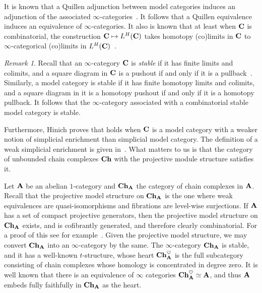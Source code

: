 \documentclass[psamsfonts]{amsart}
\theoremstyle{plain}
\theoremstyle{definition}
\theoremstyle{remark}
\newtheorem{rem}[thm]{Remark}
\newcommand{\catname}[1]{{\normalfont\textbf{#1}}}
\newcommand{\ch}{\catname{Ch}}
\newcommand{\DK}{L^H}
\begin{document}
 It is known that a Quillen adjunction between model categories induces an adjunction of the associated $\infty$-categories~\cite[Proposition 1.5.1]{HinichDK}. It follows that a Quillen equivalence induces an equivalence of $\infty$-categories. It also is known that at least when $\catname{C}$ is combinatorial, the construction $\catname{C}\mapsto \DK(\catname{C})$ takes homotopy (co)limits in $\catname{C}$ to $\infty$-categorical (co)limits in $\DK(\catname{C})$~\cite[Corollary 1.5.2]{HinichDK}. 
\begin{rem} \label{rem:stable}
 Recall that an $\infty$-category $\catname{C}$ is {\it stable} if it has finite limits and colimits, and a square diagram in $\catname{C}$ is a pushout if and only if it is a pullback~\cite[Proposition 1.1.3.4]{LurieHA}. Similarly, a model category is stable if it has finite homotopy limits and colimits, and a square diagram in it is a homotopy pushout if and only if it is a homotopy pullback. It follows that the $\infty$-category associated with a combinatorial stable model category is stable.
\end{rem}
Furthermore, Hinich proves that holds when $\catname{C}$ is a model category with a weaker notion of simplicial enrichment than simplicial model category. The definition of a weak simplicial enrichment is given in~\cite[Definition 1.4.2]{HinichDK}. What matters to us is that the category of unbounded chain complexes $\ch$ with the projective module structure satisfies it. 

Let $\catname{A}$ be an abelian $1$-category and $\ch_{\catname{A}}$ the category of chain complexes in $\catname{A}$. Recall that the projective model structure on $\ch_{\catname{A}}$ is the one where weak equivalences are quasi-isomorphisms and fibrations are level-wise surjections. If $\catname{A}$ has a set of compact projective generators, then the projective model structure on $\ch_{\catname{A}}$ exists, and is cofibrantly generated, and therefore clearly combinatorial. For a proof of this see for example~\cite{Christensen-Hovey}. Given the projective model structure, we may convert $\ch_{\catname{A}}$ into an $\infty$-category by the same. The $\infty$-category $\ch_{\catname{A}}$ is stable, and it has a well-known $t$-structure, whose heart $\ch_{\catname{A}}^{\heartsuit}$ is the full subcategory consisting of chain complexes whose homology is concentrated in degree zero. It is well known that there is an equivalence of $\infty$ categories $\ch_{\catname{A}}^{\heartsuit}\simeq \catname{A}$, and thus $\catname{A}$ embeds fully faithfully in $\ch_{\catname{A}}$ as the heart.
\end{document}
